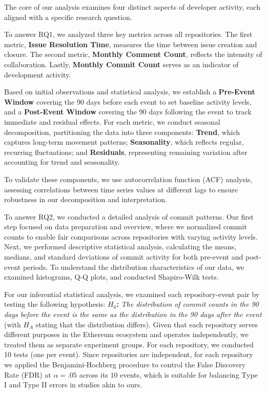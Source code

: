 The core of our analysis examines four distinct aspects of developer activity, each aligned with a specific research question.

To answer RQ1, we analyzed three key metrics across all repositories. The first metric, \textbf{Issue Resolution Time}, measures the time between issue creation and closure. The second metric, \textbf{Monthly Comment Count}, reflects the intensity of collaboration. Lastly, \textbf{Monthly Commit Count} serves as an indicator of development activity.

Based on initial observations and statistical analysis, we establish a \textbf{Pre-Event Window} covering the 90 days before each event to set baseline activity levels, and a \textbf{Post-Event Window} covering the 90 days following the event to track immediate and residual effects. For each metric, we conduct seasonal decomposition, partitioning the data into three components: \textbf{Trend}, which captures long-term movement patterns; \textbf{Seasonality}, which reflects regular, recurring fluctuations; and \textbf{Residuals}, representing remaining variation after accounting for trend and seasonality.

To validate these components, we use autocorrelation function (ACF) analysis, assessing correlations between time series values at different lags to ensure robustness in our decomposition and interpretation.

To answer RQ2, we conducted a detailed analysis of commit patterns. Our first step focused on data preparation and overview, where we normalized commit counts to enable fair comparisons across repositories with varying activity levels.
Next, we performed descriptive statistical analysis, calculating the means, medians, and standard deviations of commit activity for both pre-event and post-event periods. To understand the distribution characteristics of our data, we examined histograms, Q-Q plots, and conducted Shapiro-Wilk tests\cite{shapiro1965analysis}.

For our inferential statistical analysis, we examined each repository-event pair by testing the following hypothesis: \textbf{$H_0$:} \textit{The distribution of commit counts in the 90 days before the event is the same as the distribution in the 90 days after the event} (with \textbf{$H_A$} stating that the distribution differs). Given that each repository serves different purposes in the Ethereum ecosystem and operates independently, we treated them as separate experiment groups. For each repository, we conducted 10 tests (one per event). Since repositories are independent, for each repository we applied the Benjamini-Hochberg procedure \cite{Thissen2002Quick} to control the False Discovery Rate (FDR) at $\alpha = .05$ across its 10 events, which is suitable for balancing Type I and Type II errors \cite{Keselman2002Controlling} in studies akin to ours.

